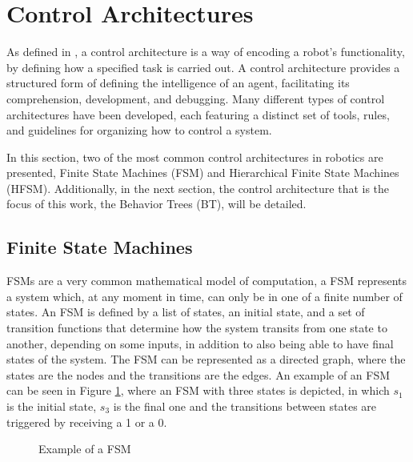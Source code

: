 \section{Control Architectures}

As defined in \cite{BTsInRobotics2}, a control architecture is a way of encoding a robot's functionality, by defining how a specified task is carried out. A control architecture provides a structured form of defining the intelligence of an agent, facilitating its comprehension, development, and debugging. Many different types of control architectures have been developed, each featuring a distinct set of tools, rules, and guidelines for organizing how to control a system.

In this section, two of the most common control architectures in robotics are presented, Finite State Machines (FSM) and Hierarchical Finite State Machines (HFSM). Additionally, in the next section, the control architecture that is the focus of this work, the Behavior Trees (BT), will be detailed.

\subsection{Finite State Machines}

FSMs are a very common mathematical model of computation, a FSM represents a system which, at any moment in time, can only be in one of a finite number of states. An FSM is defined by a list of states, an initial state, and a set of transition functions that determine how the system transits from one state to another, depending on some inputs, in addition to also being able to have final states of the system. The FSM can be represented as a directed graph, where the states are the nodes and the transitions are the edges. An example of an FSM can be seen in Figure \ref{fig:fsm_example}, where an FSM with three states is depicted, in which $s_1$ is the initial state, $s_3$ is the final one and the transitions between states are triggered by receiving a 1 or a 0.

\begin{figure}[!h]
    \centering
    \caption{Example of a FSM}
    \label{fig:fsm_example}
\end{figure}

